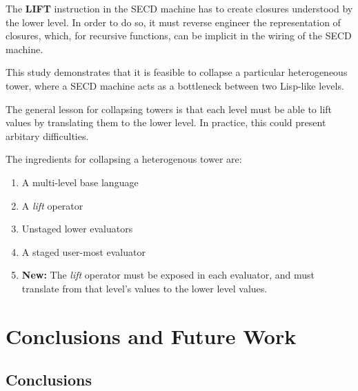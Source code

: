 \documentclass[sigplan,anonymous,review]{acmart}
\theoremstyle{definition}
\begin{document}
The \textbf{LIFT} instruction in the SECD machine has to create
closures understood by the lower level. In order to do so, it must
reverse engineer the representation of closures, which, for recursive
functions, can be implicit in the wiring of the SECD machine.

This study demonstrates that it is feasible to collapse a particular
heterogeneous tower, where a SECD machine acts as a bottleneck between
two Lisp-like levels.

The general lesson for collapsing towers is that each level must be
able to lift values by translating them to the lower level. In
practice, this could present arbitary difficulties.

The ingredients for collapsing a heterogenous tower are:
\begin{enumerate}
    \item A multi-level base language
    \item A \textit{lift} operator
    \item Unstaged lower evaluators
    \item A staged user-most evaluator
    \item \textbf{New: } The \textit{lift} operator must be exposed in each evaluator, and must translate from that level's values to the lower level values.
\end{enumerate}

\section{Conclusions and Future Work}

\subsection{Conclusions}
\end{document}
